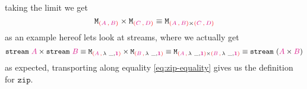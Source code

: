 \documentclass[twoside,11pt,openright]{report}
\newcommand*{\type}[1]{\textcolor{magenta!90!black}{#1}}
\newcommand*{\containerpair}[2]{\textcolor{red}{(}#1\,\textcolor{red}{,}\,#2\textcolor{red}{)}}
\newcommand*{\unit}{\type{\textbf{1}}}
\newcommand*{\function}[1]{\textcolor{blue!60!black}{\ensuremath{\mathtt{#1}}}}
\newcommand*{\typeformer}[1]{\ensuremath{\mathtt{#1}}}
\begin{document}
taking the limit we get
\begin{equation}
  \typeformer{M}_{\containerpair{\type{A}}{\type{B}}} \times \typeformer{M}_{\containerpair{\type{C}}{\type{D}}} \equiv \typeformer{M}_{\containerpair{\type{A}}{\type{B}} \times \containerpair{\type{C}}{\type{D}}}
\end{equation}
as an example hereof lets look at streams, where we actually get
\begin{equation}
  \typeformer{stream}~\type{A} \times \typeformer{stream}~\type{B} \equiv \typeformer{M}_{\containerpair{\type{A}}{\lambda~\_,\unit}} \times \typeformer{M}_{\containerpair{\type{B}}{\lambda~\_,\unit}} \equiv \typeformer{M}_{\containerpair{\type{A}}{\lambda~\_,\unit} \times \containerpair{\type{B}}{\lambda~\_,\unit}} \equiv \typeformer{stream}~(\type{A} \times \type{B}) \label{eq:zip-equality}
\end{equation}
as expected, transporting along equality \eqref{eq:zip-equality} gives us the definition for \function{zip}.
\end{document}
